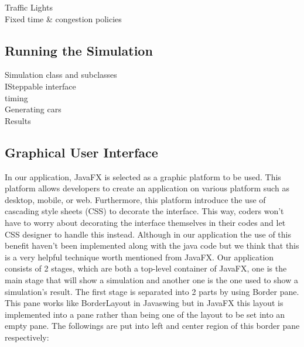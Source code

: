 \documentclass[11pt]{article}
\begin{document}
Traffic Lights
\\
Fixed time \& congestion policies

\subsection{Running the Simulation}

Simulation class and subclasses
\\
ISteppable interface
\\
timing
\\
Generating cars
\\
Results

\subsection{Graphical User Interface}
In our application, JavaFX is selected as a graphic platform to be used. This platform allows developers to create an application on various platform such as desktop, mobile, or web. Furthermore, this platform introduce the use of cascading style sheets (CSS) to decorate the interface. This way, coders won’t have to worry about decorating the interface themselves in their codes and let CSS designer to handle this instead. Although in our application the use of this benefit haven’t been implemented along with the java code but we think that this is a very helpful technique worth mentioned from JavaFX.
Our application consists of 2 stages, which are both a top-level container of JavaFX, one is the main stage that will show a simulation and another one is the one used to show a simulation’s result. The first stage is separated into 2 parts by using Border pane. This pane works like BorderLayout in Javaswing but in JavaFX this layout is implemented into a pane rather than being one of the layout to be set into an empty pane. The followings are put into left and center region of this border pane respectively:
\end{document}

